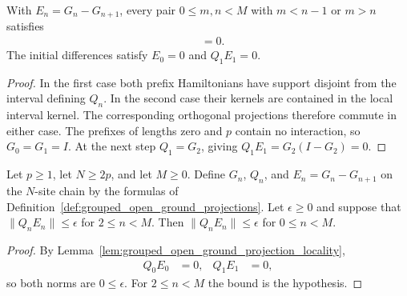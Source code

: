 \begin{lemma}
    \label{lem:grouped_open_ground_projection_locality}
    \leanok
    With $E_n=G_n-G_{n+1}$, every pair $0\leq m,n<M$ with $m<n-1$ or $m>n$
    satisfies
    \begin{align}
        [E_m,Q_n] & =0.
    \end{align}
    The initial differences satisfy $E_0=0$ and $Q_1E_1=0$.
\end{lemma}
\begin{proof}
    \leanok
    In the first case both prefix Hamiltonians have support disjoint from
    the interval defining $Q_n$. In the second case their kernels are
    contained in the local interval kernel. The corresponding orthogonal
    projections therefore commute in either case.
    The prefixes of lengths zero and $p$ contain no interaction, so
    $G_0=G_1=I$. At the next step $Q_1=G_2$, giving
    $Q_1E_1=G_2(I-G_2)=0$.
\end{proof}

\begin{lemma}
    \label{thm:grouped_c3_from_second_index}
    \leanok
    Let $p\geq1$, let $N\geq2p$, and let $M\geq0$. Define $G_n$, $Q_n$, and
    $E_n=G_n-G_{n+1}$ on the $N$-site chain by the formulas of
    Definition~\ref{def:grouped_open_ground_projections}. Let $\epsilon\geq0$
    and suppose that $\|Q_nE_n\|\leq\epsilon$ for $2\leq n<M$. Then
    $\|Q_nE_n\|\leq\epsilon$ for $0\leq n<M$.
\end{lemma}
\begin{proof}
    \leanok
    By Lemma~\ref{lem:grouped_open_ground_projection_locality},
    \begin{align}
        Q_0E_0 & =0, & Q_1E_1 & =0,
    \end{align}
    so both norms are $0\leq\epsilon$. For $2\leq n<M$ the bound is the
    hypothesis.
\end{proof}

